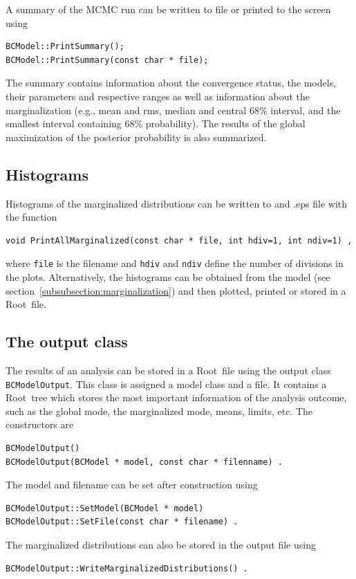\documentclass[11pt, a4paper]{article}
\newcommand{\Root}{{\sc Root}}
\begin{document}
A summary of the MCMC run can be written to file or printed to the
screen using 
%
\begin{verbatim}
BCModel::PrintSummary(); 
BCModel::PrintSummary(const char * file); 
\end{verbatim}

The summary contains information about the convergence status, the
models, their parameters and respective ranges as well as information
about the marginalization (e.g., mean and rms, median and central 68\%
interval, and the smallest interval containing 68\% probability). The
results of the global maximization of the posterior probability is
also summarized.


\subsection{Histograms}

Histograms of the marginalized distributions can be written to and
.eps file with the function
%
\begin{verbatim}
void PrintAllMarginalized(const char * file, int hdiv=1, int ndiv=1) ,
\end{verbatim}
%
\noindent 
where \verb|file| is the filename and \verb|hdiv| and \verb|ndiv|
define the number of divisions in the plots. Alternatively, the
histograms can be obtained from the model (see
section~\ref{subsubsection:marginalization}) and then plotted, printed
or stored in a \Root\ file.


\subsection{The output class}

The results of an analysis can be stored in a \Root\ file using the
output class \verb|BCModelOutput|. This class is assigned a model
class and a file. It contains a \Root\ tree which stores the most
important information of the analysis outcome, such as the global
mode, the marginalized mode, means, limits, etc. The constructors are
%
\begin{verbatim}
BCModelOutput() 
BCModelOutput(BCModel * model, const char * filenname) .
\end{verbatim}
%
The model and filename can be set after construction using 
%
\begin{verbatim}
BCModelOutput::SetModel(BCModel * model) 
BCModelOutput::SetFile(const char * filename) . 
\end{verbatim}
%
The marginalized distributions can also be stored in the output file
using
%
\begin{verbatim}
BCModelOutput::WriteMarginalizedDistributions() . 
\end{verbatim}
\end{document}
